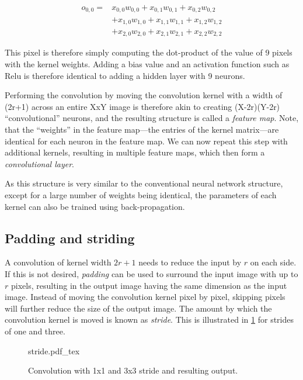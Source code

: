 \begin{eqnarray}
o_{0,0}=&x_{0,0}w_{0,0}+x_{0,1}w_{0,1}+x_{0,2}w_{0,2}\\
\nonumber
		&+x_{1,0}w_{1,0}+x_{1,1}w_{1,1}+x_{1,2}w_{1,2}\\
\nonumber
		&+x_{2,0}w_{2,0}+x_{2,1}w_{2,1}+x_{2,2}w_{2,2}
\end{eqnarray}

This pixel is therefore simply computing the dot-product of the value of 9 pixels with the kernel weights. Adding a bias value and an activation function such as Relu is therefore identical to adding a hidden layer with 9 neurons. 

Performing the convolution by moving the convolution kernel with a width of (2r+1) across an entire XxY image is therefore akin to creating (X-2r)(Y-2r) ``convolutional'' neurons, and the resulting structure is called a \textsl{feature map}. Note, that the ``weights'' in the feature map---the entries of the kernel matrix---are identical for each neuron in the feature map. We can now repeat this step with additional kernels, resulting in multiple feature maps, which then form a \textsl{convolutional layer}.

As this structure is very similar to the conventional neural network structure, except for a large number of weights being identical, the parameters of each kernel can also be trained using back-propagation. 

\subsection{Padding and striding}

A convolution of kernel width $2r+1$ needs to reduce the input by $r$ on each side. If this is not desired, \textsl{padding} can be used to surround the input image with up to $r$ pixels, resulting in the output image having the same dimension as the input image. Instead of moving the convolution kernel pixel by pixel, skipping pixels will further reduce the size of the output image. The amount by which the convolution kernel is moved is known as \textsl{stride}. This is illustrated in \cref{fig:stride} for strides of one and three.

\begin{figure}[htb]
    \centering
    \def\svgwidth{0.8\textwidth}
    {stride.pdf_tex}
    \caption{Convolution with 1x1 and 3x3 stride and resulting output.\label{fig:stride}}
\end{figure}

